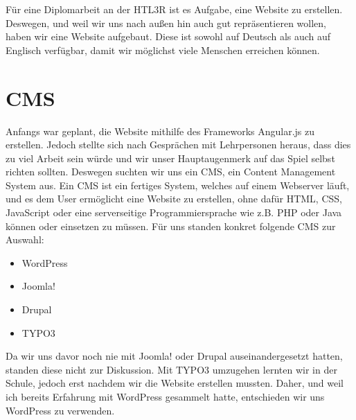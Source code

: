 Für eine Diplomarbeit an der HTL3R ist es Aufgabe, eine Website zu erstellen.
Deswegen, und weil wir uns nach außen hin auch gut repräsentieren wollen, haben wir eine Website aufgebaut.
Diese ist sowohl auf Deutsch als auch auf Englisch verfügbar, damit wir möglichst viele Menschen erreichen können.

\section{CMS}
Anfangs war geplant, die Website mithilfe des Frameworks Angular.js zu erstellen.
Jedoch stellte sich nach Gesprächen mit Lehrpersonen heraus, dass dies zu viel Arbeit sein würde und wir unser Hauptaugenmerk auf das Spiel selbst richten sollten.
Deswegen suchten wir uns ein CMS, ein Content Management System aus.
Ein CMS ist ein fertiges System, welches auf einem Webserver läuft, und es dem User ermöglicht eine Website zu erstellen, ohne dafür HTML, CSS, JavaScript oder eine serverseitige Programmiersprache wie z.B. PHP oder Java können oder einsetzen zu müssen. \citep{website:CMSdefinition}
Für uns standen konkret folgende CMS zur Auswahl:
\begin{itemize}
    \item WordPress \citep{website:WordPress}
    \item Joomla! \citep{website:Joomla}
    \item Drupal \citep{website:Drupal}
    \item TYPO3 \citep{website:typo3}
\end{itemize}
Da wir uns davor noch nie mit Joomla! oder Drupal auseinandergesetzt hatten, standen diese nicht zur Diskussion.
Mit TYPO3 umzugehen lernten wir in der Schule, jedoch erst nachdem wir die Website erstellen mussten.
Daher, und weil ich bereits Erfahrung mit WordPress gesammelt hatte, entschieden wir uns WordPress zu verwenden.

